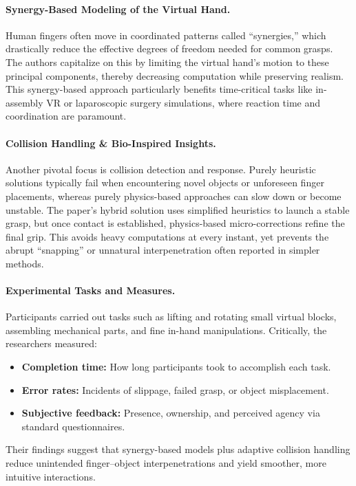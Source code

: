 \documentclass[11pt]{llncs}
\begin{document}
\paragraph{Synergy-Based Modeling of the Virtual Hand.}
Human fingers often move in coordinated patterns called ``synergies,'' which drastically reduce the effective degrees of freedom needed for common grasps. The authors capitalize on this by limiting the virtual hand’s motion to these principal components, thereby decreasing computation while preserving realism. This synergy-based approach particularly benefits time-critical tasks like in-assembly VR or laparoscopic surgery simulations, where reaction time and coordination are paramount.

\paragraph{Collision Handling \& Bio-Inspired Insights.}
Another pivotal focus is collision detection and response. Purely heuristic solutions typically fail when encountering novel objects or unforeseen finger placements, whereas purely physics-based approaches can slow down or become unstable. The paper’s hybrid solution uses simplified heuristics to launch a stable grasp, but once contact is established, physics-based micro-corrections refine the final grip. This avoids heavy computations at every instant, yet prevents the abrupt ``snapping'' or unnatural interpenetration often reported in simpler methods.

\paragraph{Experimental Tasks and Measures.}
Participants carried out tasks such as lifting and rotating small virtual blocks, assembling mechanical parts, and fine in-hand manipulations. Critically, the researchers measured:
\begin{itemize}
    \item \textbf{Completion time:} How long participants took to accomplish each task.
    \item \textbf{Error rates:} Incidents of slippage, failed grasp, or object misplacement.
    \item \textbf{Subjective feedback:} Presence, ownership, and perceived agency via standard questionnaires.
\end{itemize}
Their findings suggest that synergy-based models plus adaptive collision handling reduce unintended finger--object interpenetrations and yield smoother, more intuitive interactions.
\end{document}
